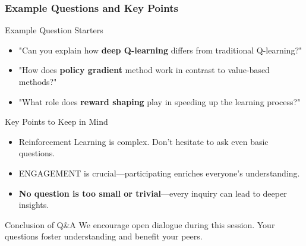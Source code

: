 \documentclass[aspectratio=169]{beamer}
\begin{document}
\begin{frame}[fragile]
    \frametitle{Example Questions and Key Points}
    \begin{block}{Example Question Starters}
        \begin{itemize}
            \item "Can you explain how \textbf{deep Q-learning} differs from traditional Q-learning?"
            \item "How does \textbf{policy gradient} method work in contrast to value-based methods?"
            \item "What role does \textbf{reward shaping} play in speeding up the learning process?"
        \end{itemize}
    \end{block}

    \begin{block}{Key Points to Keep in Mind}
        \begin{itemize}
            \item Reinforcement Learning is complex. Don’t hesitate to ask even basic questions.
            \item ENGAGEMENT is crucial—participating enriches everyone's understanding.
            \item \textbf{No question is too small or trivial}—every inquiry can lead to deeper insights.
        \end{itemize}
    \end{block}
    
    \begin{block}{Conclusion of Q\&A}
        We encourage open dialogue during this session. Your questions foster understanding and benefit your peers.
    \end{block}
\end{frame}
\end{document}
